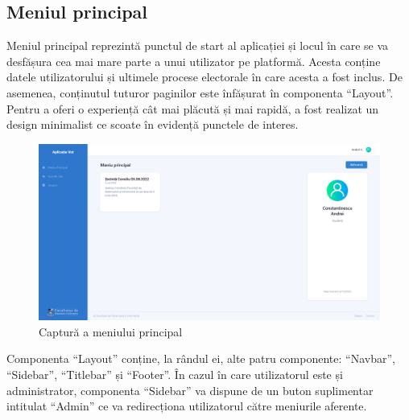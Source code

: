 \subsection{Meniul principal}

Meniul principal reprezintă punctul de start al aplicației și locul în care se va desfășura cea mai mare parte a unui utilizator pe platformă. Acesta conține datele utilizatorului și ultimele procese electorale în care acesta a fost inclus. De asemenea, conținutul tuturor paginilor este înfășurat în componenta \enquote{Layout}. Pentru a oferi o experiență cât mai plăcută și mai rapidă, a fost realizat un design minimalist ce scoate în evidență punctele de interes.

\begin{figure}[!ht]
    \centering
    \includegraphics[width=145mm]{images/page_main.png}
    \caption{Captură a meniului principal}
\end{figure}

Componenta \enquote{Layout} conține, la rândul ei, alte patru componente: \enquote{Navbar}, \enquote{Sidebar}, \enquote{Titlebar} și \enquote{Footer}. În cazul în care utilizatorul este și administrator, componenta \enquote{Sidebar} va dispune de un buton suplimentar intitulat \enquote{Admin} ce va redirecționa utilizatorul către meniurile aferente.

